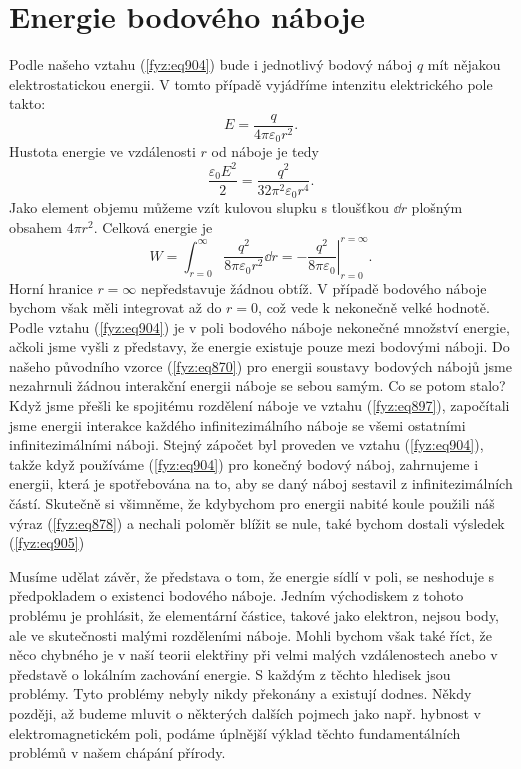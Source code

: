   \section{Energie bodového náboje}\label{fyz:IIchapVIsecVI}
    Podle našeho vztahu (\ref{fyz:eq904}) bude i jednotlivý bodový náboj \(q\) mít nějakou
    elektrostatickou energii. V tomto případě vyjádříme intenzitu elektrického pole takto:
    \begin{equation*}
      E=\dfrac{q}{4π\varepsilon_0r^2}.
    \end{equation*}
    Hustota energie ve vzdálenosti \(r\) od náboje je tedy
    \begin{equation*}
      \dfrac{\varepsilon_0E^2}{2}=\dfrac{q^2}{32π^2\varepsilon_0r^4}.
    \end{equation*}
    Jako element objemu můžeme vzít kulovou slupku s tloušťkou \(\dd{r}\) plošným obsahem \(4πr^2\).
    Celková energie je
    \begin{equation}\label{fyz:eq905}
      W =\int_{r=0}^∞\dfrac{q^2}{8π\varepsilon_0r^2}\dd{r}
        =−\left.\dfrac{q^2}{8π\varepsilon_0}\right\rvert^{r=∞}_{r=0}.
    \end{equation}
    Horní hranice \(r=∞\) nepředstavuje žádnou obtíž. V případě bodového náboje bychom však měli
    integrovat až do \(r = 0\), což vede k nekonečně velké hodnotě. Podle vztahu (\ref{fyz:eq904})
    je v poli bodového náboje nekonečné množství energie, ačkoli jsme vyšli z představy, že energie
    existuje pouze mezi bodovými náboji. Do našeho původního vzorce (\ref{fyz:eq870}) pro energii
    soustavy bodových nábojů jsme nezahrnuli žádnou interakční energii náboje se sebou samým. Co se
    potom stalo? Když jsme přešli ke spojitému rozdělení náboje ve vztahu (\ref{fyz:eq897}),
    započítali jsme energii interakce každého infinitezimálního náboje se všemi ostatními
    infinitezimálními náboji. Stejný zápočet byl proveden ve vztahu (\ref{fyz:eq904}), takže když
    používáme (\ref{fyz:eq904}) pro konečný bodový náboj, zahrnujeme i energii, která je
    spotřebována na to, aby se daný náboj sestavil z infinitezimálních částí. Skutečně si všimněme,
    že kdybychom pro energii nabité koule použili náš výraz (\ref{fyz:eq878}) a nechali poloměr
    blížit se nule, také bychom dostali výsledek (\ref{fyz:eq905})

    Musíme udělat závěr, že představa o tom, že energie sídlí v poli, se neshoduje s předpokladem o
    existenci bodového náboje. Jedním východiskem z tohoto problému je prohlásit, že elementární
    částice, takové jako elektron, nejsou body, ale ve skutečnosti malými rozděleními náboje. Mohli
    bychom však také říct, že něco chybného je v naší teorii elektřiny při velmi malých
    vzdálenostech anebo v představě o lokálním zachování energie. S každým z těchto hledisek jsou
    problémy. Tyto problémy nebyly nikdy překonány a existují dodnes. Někdy později, až budeme
    mluvit o některých dalších pojmech jako např. hybnost v elektromagnetickém poli, podáme úplnější
    výklad těchto fundamentálních problémů v našem chápání přírody.